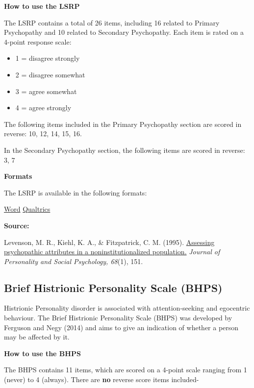 \documentclass[
]{book}
\providecommand{\tightlist}{%
  \setlength{\itemsep}{0pt}\setlength{\parskip}{0pt}}
\begin{document}
\textbf{How to use the LSRP}

The LSRP contains a total of 26 items, including 16 related to Primary Psychopathy and 10 related to Secondary Psychopathy. Each item is rated on a 4-point response scale:

\begin{itemize}
\tightlist
\item
  1 = disagree strongly
\item
  2 = disagree somewhat
\item
  3 = agree somewhat
\item
  4 = agree strongly
\end{itemize}

The following items included in the Primary Psychopathy section are scored in reverse: 10, 12, 14, 15, 16.

In the Secondary Psychopathy section, the following items are scored in reverse: 3, 7

\textbf{Formats}

The LSRP is available in the following formats:

\href{/questionnaires/LevensonSelf-ReportPsychopathyScale_LSRP.docx}{Word} \textbar{} \href{/questionnaires/LevensonSelf-ReportPsychopathyScale_LSRP.qsf}{Qualtrics}

\textbf{Source:}

Levenson, M. R., Kiehl, K. A., \& Fitzpatrick, C. M. (1995). \href{https://www.researchgate.net/profile/Michael_Levenson2/publication/15338539_Assessing_Psychopathic_Attributes_in_a_Noninstitutionalized_Population/links/54b6d8360cf2bd04be334b31.pdf}{Assessing psychopathic attributes in a noninstitutionalized population.} \emph{Journal of Personality and Social Psychology, 68}(1), 151.

\hypertarget{brief-histrionic-personality-scale-bhps}{%
\subsection{Brief Histrionic Personality Scale (BHPS)}\label{brief-histrionic-personality-scale-bhps}}

Histrionic Personality disorder is associated with attention-seeking and egocentric behaviour. The Brief Histrionic Personality Scale (BHPS) was developed by Ferguson and Negy (2014) and aims to give an indication of whether a person may be affected by it.

\textbf{How to use the BHPS}

The BHPS contains 11 items, which are scored on a 4-point scale ranging from 1 (never) to 4 (always). There are \textbf{no} reverse score items included-
\end{document}
